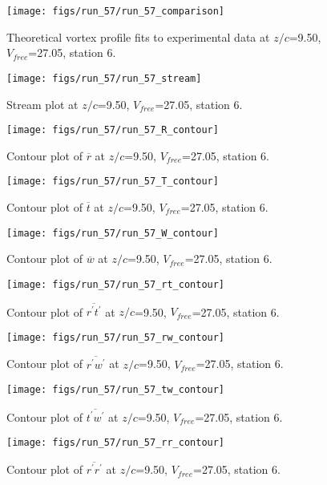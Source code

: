 \begin{figure}[H]
\centering
\texttt{[image: figs/run\_57/run\_57\_comparison]}
\caption{Theoretical vortex profile fits to experimental data at $z/c$=9.50, $V_{free}$=27.05, station 6.}
\end{figure}


\begin{figure}[H]
\centering
\texttt{[image: figs/run\_57/run\_57\_stream]}
\caption{Stream plot at $z/c$=9.50, $V_{free}$=27.05, station 6.}
\end{figure}


\begin{figure}[H]
\centering
\texttt{[image: figs/run\_57/run\_57\_R\_contour]}
\caption{Contour plot of $\overline{r}$ at $z/c$=9.50, $V_{free}$=27.05, station 6.}
\end{figure}


\begin{figure}[H]
\centering
\texttt{[image: figs/run\_57/run\_57\_T\_contour]}
\caption{Contour plot of $\overline{t}$ at $z/c$=9.50, $V_{free}$=27.05, station 6.}
\end{figure}


\begin{figure}[H]
\centering
\texttt{[image: figs/run\_57/run\_57\_W\_contour]}
\caption{Contour plot of $\overline{w}$ at $z/c$=9.50, $V_{free}$=27.05, station 6.}
\end{figure}


\begin{figure}[H]
\centering
\texttt{[image: figs/run\_57/run\_57\_rt\_contour]}
\caption{Contour plot of $\overline{r^\prime t^\prime}$ at $z/c$=9.50, $V_{free}$=27.05, station 6.}
\end{figure}


\begin{figure}[H]
\centering
\texttt{[image: figs/run\_57/run\_57\_rw\_contour]}
\caption{Contour plot of $\overline{r^\prime w^\prime}$ at $z/c$=9.50, $V_{free}$=27.05, station 6.}
\end{figure}


\begin{figure}[H]
\centering
\texttt{[image: figs/run\_57/run\_57\_tw\_contour]}
\caption{Contour plot of $\overline{t^\prime w^\prime}$ at $z/c$=9.50, $V_{free}$=27.05, station 6.}
\end{figure}


\begin{figure}[H]
\centering
\texttt{[image: figs/run\_57/run\_57\_rr\_contour]}
\caption{Contour plot of $\overline{r^\prime r^\prime}$ at $z/c$=9.50, $V_{free}$=27.05, station 6.}
\end{figure}


